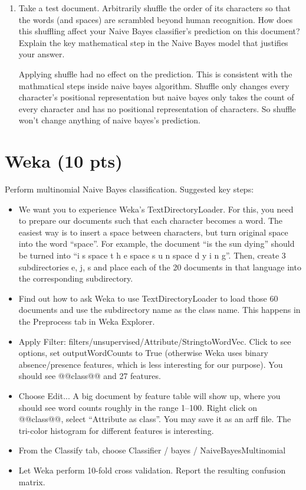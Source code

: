 \documentclass[a4paper]{article}
\theoremstyle{definition}
\newenvironment{soln}{
    \leavevmode\color{blue}\ignorespaces
}{}
\begin{document}
\begin{enumerate}
\item Take a test document.   Arbitrarily shuffle the order of its characters so that the words (and spaces) are scrambled beyond human recognition.  How does this shuffling affect your Naive Bayes classifier's prediction on this document?  Explain the key mathematical step in the Naive Bayes model that justifies your answer.

\begin{soln}
Applying shuffle had no effect on the prediction. This is consistent with the mathmatical steps inside naive bayes algorithm.  Shuffle only changes every character's positional representation but naive bayes only takes the count of every character and has no positional representation of characters. So shuffle won't change anything of naive bayes's prediction.
\end{soln}

\end{enumerate}

\section{Weka (10 pts)}
Perform multinomial Naive Bayes classification.  Suggested key steps:
\begin{itemize}
\item We want you to experience Weka's TextDirectoryLoader.  For this, you need to prepare our documents such that each character becomes a word.  The easiest way is to insert a space between characters, but turn original space into the word ``space''.  For example, the document ``is the sun dying'' should be turned into ``i s space t h e space s u n space d y i n g''.
Then, create 3 subdirectories e, j, s and place each of the 20 documents in that language into the corresponding subdirectory.  
\item Find out how to ask Weka to use TextDirectoryLoader to load those 60 documents and use the subdirectory name as the class name.  This happens in the Preprocess tab in Weka Explorer.
\item Apply Filter: filters/unsupervised/Attribute/StringtoWordVec. Click to see options, set outputWordCounts to True (otherwise Weka uses binary absence/presence features, which is less interesting for our purpose). You should see @@class@@ and 27 features.
\item Choose Edit...  A big document by feature table will show up, where you should see word counts roughly in the range 1--100.  Right click on @@class@@, select ``Attribute as class''.  You may save it as an arff file.
The tri-color histogram for different features is interesting.
\item From the Classify tab, choose Classifier / bayes / NaiveBayesMultinomial
\item Let Weka perform 10-fold cross validation.  Report the resulting confusion matrix.
\end{itemize}



\end{document}
